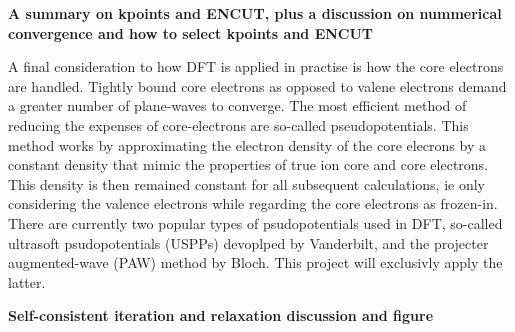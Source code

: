 \textbf{A summary on kpoints and ENCUT, plus a discussion on nummerical convergence and how to select kpoints and ENCUT}


A final consideration to how DFT is applied in practise is how the core electrons are handled. Tightly bound core electrons as opposed to valene electrons demand a greater number of plane-waves to converge. The most efficient method of reducing the expenses of core-electrons are so-called pseudopotentials. This method works by approximating the electron density of the core elecrons by a constant density that mimic the properties of true ion core and core electrons. This density is then remained constant for all subsequent calculations, ie only considering the valence electrons while regarding the core electrons as frozen-in. There are currently two popular types of psudopotentials used in DFT, so-called ultrasoft psudopotentials (USPPs) devoplped by Vanderbilt, and the projecter augmented-wave (PAW) method by Bloch. This project will exclusivly apply the latter. 

\textbf{Self-consistent iteration and relaxation discussion and figure}
